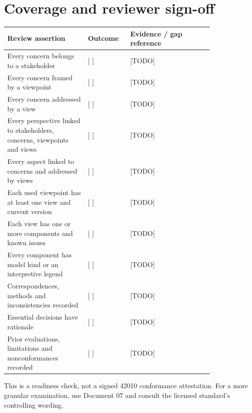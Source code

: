 \documentclass[11pt,letterpaper]{article}
\begin{document}
\section{Coverage and reviewer sign-off}
\begin{longtable}{p{0.34\linewidth}p{0.15\linewidth}p{0.35\linewidth}}\toprule
\textbf{Review assertion}&\textbf{Outcome}&\textbf{Evidence / gap reference}\\\midrule\endhead
Every concern belongs to a stakeholder&[ ]&[TODO]\\
Every concern framed by a viewpoint&[ ]&[TODO]\\
Every concern addressed by a view&[ ]&[TODO]\\
Every perspective linked to stakeholders, concerns, viewpoints and views&[ ]&[TODO]\\
Every aspect linked to concerns and addressed by views&[ ]&[TODO]\\
Each used viewpoint has at least one view and current version&[ ]&[TODO]\\
Each view has one or more components and known issues&[ ]&[TODO]\\
Every component has model kind or an interpretive legend&[ ]&[TODO]\\
Correspondences, methods and inconsistencies recorded&[ ]&[TODO]\\
Essential decisions have rationale&[ ]&[TODO]\\
Prior evaluations, limitations and nonconformances recorded&[ ]&[TODO]\\\bottomrule\end{longtable}
\begin{Guidance}This is a readiness check, not a signed 42010 conformance attestation. For a more granular examination, use Document 07 and consult the licensed standard's controlling wording.\end{Guidance}
\LegalFooter
\end{document}
